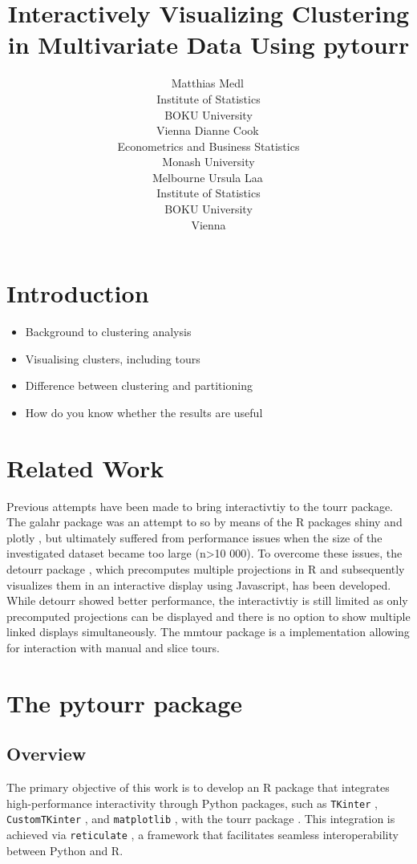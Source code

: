 \documentclass[article]{ajs}
\author{Matthias Medl\,\orcidlink{0000-0002-3354-4579}\\ Institute of Statistics \\ BOKU University \\ Vienna \And 
        Dianne Cook\,\orcidlink{0000-0002-3813-7155}\\ Econometrics and Business Statistics \\ Monash University \\ Melbourne \And
        Ursula Laa\,\orcidlink{0000-0002-0249-6439}\\ Institute of Statistics \\ BOKU University \\ Vienna}
\title{Interactively Visualizing Clustering in Multivariate Data Using pytourr}
\begin{document}
\section{Introduction}

\begin{itemize} \itemsep 0in
\item Background to clustering analysis
\item Visualising clusters, including tours
\item Difference between clustering and partitioning
\item How do you know whether the results are useful
\end{itemize}

\section{Related Work}

Previous attempts have been made to bring interactivtiy to the tourr package. The galahr package \citep{galahr} was an attempt to so by means of the R packages shiny \citep{shiny} and plotly \citep{plotly}, but ultimately suffered from performance issues when the size of the investigated dataset became too large (n>10 000). To overcome these issues, the detourr package \citep{detourr}, which precomputes multiple projections in R and subsequently visualizes them in an interactive display using Javascript, has been developed. While detourr showed better performance, the interactivtiy is still limited as only precomputed projections can be displayed and there is no option to show multiple linked displays simultaneously. The mmtour package \citep{laa2023new} is a  implementation allowing for interaction with manual and slice tours.  

\section{The pytourr package}

\subsection{Overview}

The primary objective of this work is to develop an R package that integrates high-performance interactivity through Python packages, such as \texttt{TKinter} \citep{lundh1999introduction}, \texttt{CustomTKinter} \citep{schimansky24}, and \texttt{matplotlib} \citep{Hunter:2007}, with the tourr package \citep{tourr}. This integration is achieved via \texttt{reticulate} \citep{reticulate}, a framework that facilitates seamless interoperability between Python and R.
\end{document}
